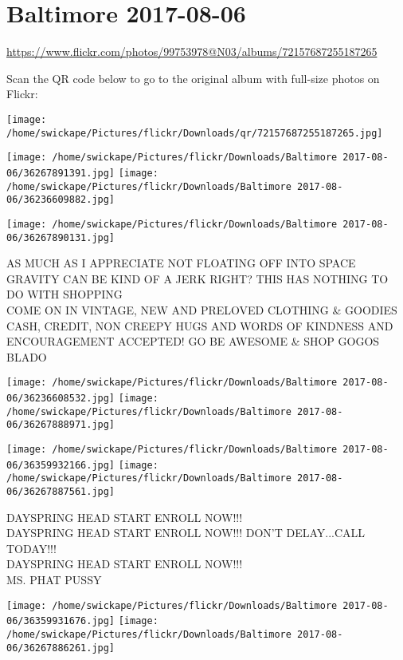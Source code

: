 \documentclass[10pt,letterpaper]{article}
\title{}
\author{}
\date{}
\begin{document}
\section*{Baltimore 2017-08-06}

\url{https://www.flickr.com/photos/99753978@N03/albums/72157687255187265}

Scan the QR code below to go to the original album with full-size photos on Flickr:

\texttt{[image: /home/swickape/Pictures/flickr/Downloads/qr/72157687255187265.jpg]}
\pagebreak

\texttt{[image: /home/swickape/Pictures/flickr/Downloads/Baltimore 2017-08-06/36267891391.jpg]}
\texttt{[image: /home/swickape/Pictures/flickr/Downloads/Baltimore 2017-08-06/36236609882.jpg]}

\vspace{0.25in}
\texttt{[image: /home/swickape/Pictures/flickr/Downloads/Baltimore 2017-08-06/36267890131.jpg]}

AS MUCH AS I APPRECIATE NOT FLOATING OFF INTO SPACE GRAVITY CAN BE KIND OF A JERK RIGHT?  THIS HAS NOTHING TO DO WITH SHOPPING\\
COME ON IN VINTAGE, NEW AND PRELOVED CLOTHING \& GOODIES CASH, CREDIT, NON CREEPY HUGS AND WORDS OF KINDNESS AND ENCOURAGEMENT ACCEPTED!  GO BE AWESOME \& SHOP GOGOS\\
BLADO
\pagebreak

\texttt{[image: /home/swickape/Pictures/flickr/Downloads/Baltimore 2017-08-06/36236608532.jpg]}
\texttt{[image: /home/swickape/Pictures/flickr/Downloads/Baltimore 2017-08-06/36267888971.jpg]}

\texttt{[image: /home/swickape/Pictures/flickr/Downloads/Baltimore 2017-08-06/36359932166.jpg]}
\texttt{[image: /home/swickape/Pictures/flickr/Downloads/Baltimore 2017-08-06/36267887561.jpg]}

DAYSPRING HEAD START ENROLL NOW!!!\\
DAYSPRING HEAD START ENROLL NOW!!!  DON'T DELAY...CALL TODAY!!!\\
DAYSPRING HEAD START ENROLL NOW!!!\\
MS. PHAT PUSSY
\pagebreak

\texttt{[image: /home/swickape/Pictures/flickr/Downloads/Baltimore 2017-08-06/36359931676.jpg]}
\texttt{[image: /home/swickape/Pictures/flickr/Downloads/Baltimore 2017-08-06/36267886261.jpg]}
\end{document}
